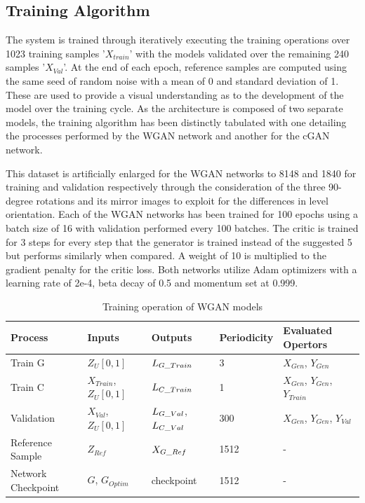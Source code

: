 \documentclass{Configuration_Files/PoliMi3i_thesis}
\begin{document}
\subsection{Training Algorithm}
The system is trained through iteratively executing the training operations over 1023
training samples '$X_{train}$' with the models validated over the remaining 240 samples 
'$X_{Val}$'. At the end of each epoch, reference samples are computed using the same 
seed of random noise with a mean of 0 and standard deviation of 1. These are used to 
provide a visual understanding as to the development of the model over the training cycle. 
As the architecture is composed of two separate models, the training algorithm has been 
distinctly tabulated with one detailing the processes performed by the WGAN network and 
another for the cGAN network.

This dataset is artificially enlarged for the WGAN networks to 8148 and 1840 
for training and validation respectively through the consideration of the three 
90-degree rotations and its mirror images to exploit for the differences in level 
orientation. Each of the WGAN networks has been trained for 
100 epochs using a batch size of 16 with validation performed every 100 batches. 
The critic is trained for 3 steps for every step that the generator is trained instead of the 
suggested 5 but performs similarly when compared. A weight of 10 is multiplied to the 
gradient penalty for the critic loss. Both networks utilize Adam optimizers with a learning 
rate of 2e-4, beta decay of 0.5 and momentum set at 0.999.
\begin{table}[H]
\centering 
\begin{tabular}{ |C{2.5cm}|C{2.5cm}|C{2.5cm}|C{2.5cm}|C{2.5cm}|}
\hline
\textbf{Process} & \textbf{Inputs} & \textbf{Outputs} & \textbf{Periodicity} & \textbf{Evaluated Opertors} \\
\hline
Train G & $Z_{U}[0,1]$ & $L_{G\char`_Train}$ & 3 & $X_{Gen}$, $Y_{Gen}$\\
\hline
Train C & $X_{Train}$, $Z_{U}[0,1]$ & $L_{C\char`_Train}$ & 1 & $X_{Gen}$, $Y_{Gen}$, $Y_{Train}$\\
\hline
Validation & $X_{Val}$, $Z_{U}[0,1]$ & $L_{G\char`_Val}$, $L_{C\char`_Val}$ & 300 & $X_{Gen}$, $Y_{Gen}$, $Y_{Val}$\\
\hline
Reference Sample & $Z_{Ref}$ & $X_{G\char`_Ref}$ & 1512 & -\\
\hline
Network Checkpoint & $G$, $G_{Optim}$ & checkpoint & 1512 & -\\
\hline
\end{tabular}
\\[10pt]
\caption{Training operation of WGAN models}
\label{table:wgantrain}
\end{table}
\newpage
\end{document}
